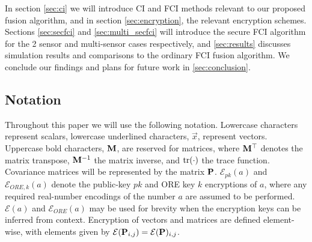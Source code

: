 \documentclass[letterpaper, 10 pt, conference]{ieeeconf}  %
\begin{document}
In section \ref{sec:ci} we will introduce CI and FCI methods relevant to our proposed fusion algorithm, and in section \ref{sec:encryption}, the relevant encryption schemes. Sections \ref{sec:secfci} and \ref{sec:multi_secfci} will introduce the secure FCI algorithm for the 2 sensor and multi-sensor cases respectively, and \ref{sec:results} discusses simulation results and comparisons to the ordinary FCI fusion algorithm. We conclude our findings and plans for future work in \ref{sec:conclusion}.

\subsection{Notation}
Throughout this paper we will use the following notation. Lowercase characters represent scalars, lowercase underlined characters, $\vec{x}$, represent vectors. Uppercase bold characters, ${{\mathbf{M}}}$, are reserved for matrices, where ${{\mathbf{M}}}^\top$ denotes the matrix transpose, ${{\mathbf{M}}}^{-1}$ the matrix inverse, and $\operatorname{tr}(\cdot)$ the trace function. Covariance matrices will be represented by the matrix ${{\mathbf{P}}}$. $\mathcal{E}_{pk}(a)$ and $\mathcal{E}_{ORE,k}(a)$ denote the public-key $pk$ and ORE key $k$ encryptions of $a$, where any required real-number encodings of the number $a$ are assumed to be performed. $\mathcal{E}(a)$ and $\mathcal{E}_{ORE}(a)$ may be used for brevity when the encryption keys can be inferred from context. Encryption of vectors and matrices are defined element-wise, with elements given by $\mathcal{E}({{\mathbf{P}}}_{i,j}) = \mathcal{E}({{\mathbf{P}}})_{i,j}$.

\end{document}
